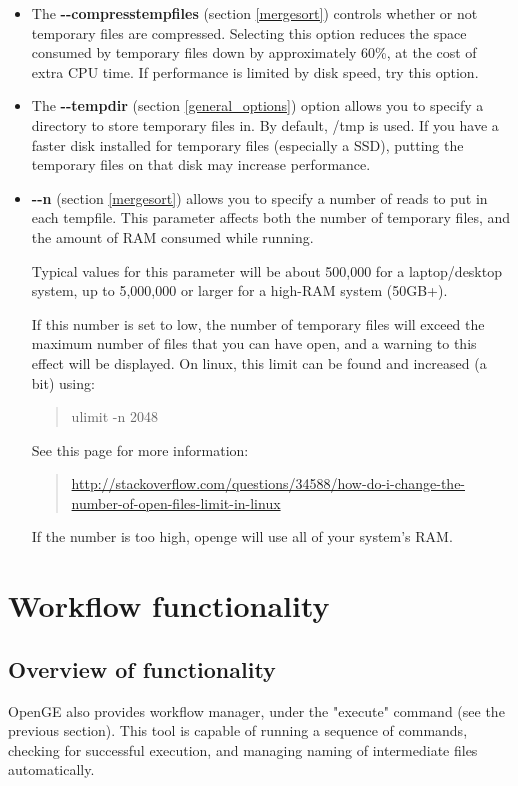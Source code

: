 \documentclass[11pt]{article}
\newcommand {\cmd}[1] {\begin{quote}#1\end{quote}}
\begin{document}
\begin{itemize}
\item The \textbf{{-}{-}compresstempfiles} (section \ref{mergesort})  controls whether or not temporary files are compressed. Selecting this option reduces the space consumed by temporary files down by approximately 60\%, at the cost of extra CPU time. If performance is limited by disk speed, try this option.
\item The \textbf{{-}{-}tempdir} (section \ref{general_options})  option allows you to specify a directory to store temporary files in. By default, /tmp is used. If you have a faster disk installed for temporary files (especially a SSD), putting the temporary files on that disk may increase performance.
\item \textbf{{-}{-}n} (section \ref{mergesort}) allows you to specify a number of reads to put in each tempfile. This parameter affects both the number of temporary files, and the amount of RAM consumed while running.

Typical values for this parameter will be about 500,000 for a laptop/desktop system, up to 5,000,000 or larger for a high-RAM system (50GB+).

If this number is set to low, the number of temporary files will exceed the maximum number of files that you can have open, and a warning to this effect will be displayed. On linux, this limit can be found and increased (a bit) using: \cmd{ulimit -n 2048} See this page for more information:
\cmd{\href{http://stackoverflow.com/questions/34588/how-do-i-change-the-number-of-open-files-limit-in-linux}{http://stackoverflow.com/questions/34588/how-do-i-change-the-number-of-open-files-limit-in-linux}}

If the number is too high, openge will use all of your system's RAM.
\end{itemize}

\section {Workflow functionality}
\subsection {Overview of functionality}
\label{pipeline_functionality}
OpenGE also provides workflow manager, under the "execute" command (see the previous section). This tool is capable of running a sequence of commands, checking for successful execution, and managing naming of intermediate files automatically.
\end{document}
